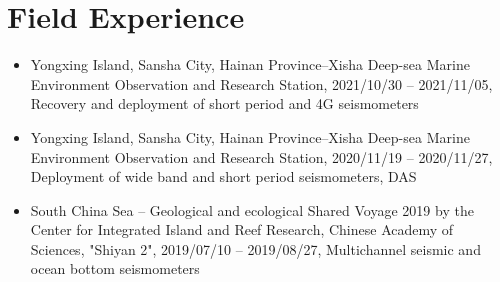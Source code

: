 \section{Field Experience}
\begin{itemize}
\item Yongxing Island, Sansha City, Hainan Province--Xisha Deep-sea Marine Environment Observation and Research Station,
    2021/10/30 -- 2021/11/05, Recovery and deployment of short period and 4G seismometers
\item Yongxing Island, Sansha City, Hainan Province--Xisha Deep-sea Marine Environment Observation and Research Station,
    2020/11/19 -- 2020/11/27, Deployment of wide band and short period seismometers, DAS
\item South China Sea -- Geological and ecological Shared Voyage 2019 by the Center for Integrated Island and Reef Research, Chinese Academy of Sciences, "Shiyan 2",
    2019/07/10 -- 2019/08/27, Multichannel seismic and ocean bottom seismometers
\end{itemize}


